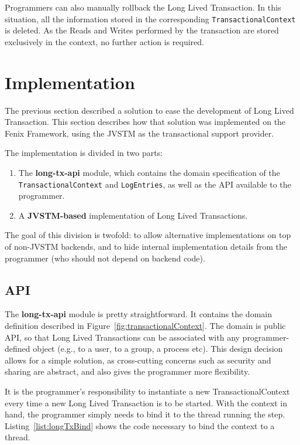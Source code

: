 Programmers can also manually rollback the Long Lived Transaction. In
this situation, all the information stored in the corresponding
\texttt{TransactionalContext} is deleted. As the Reads and Writes
performed by the transaction are stored exclusively in the context, no
further action is required.

\section{Implementation}
\label{sec:impl}


The previous section described a solution to ease the development of
Long Lived Transaction. This section describes how that solution was
implemented on the Fenix Framework, using the JVSTM as the
transactional support provider.

The implementation is divided in two parts:

\begin{enumerate}

\item The {\bf long-tx-api} module, which contains the domain
  specification of the \texttt{TransactionalContext} and
  \texttt{LogEntries}, as well as the API available to the programmer.

\item A {\bf JVSTM-based} implementation of Long Lived Transactions.
\end{enumerate}

The goal of this division is twofold: to allow alternative
implementations on top of non-JVSTM backends, and to hide internal
implementation details from the programmer (who should not depend on
backend code).

\subsection{API}

The {\bf long-tx-api} module is pretty straightforward. It contains
the domain definition described in
Figure~\ref{fig:transactionalContext}. The domain is public API, so
that Long Lived Transactions can be associated with any
programmer-defined object (e.g., to a user, to a group, a process
etc). This design decision allows for a simple solution, as
cross-cutting concerns such as security and sharing are abstract, and
also gives the programmer more flexibility.

It is the programmer's responsibility to instantiate a new
TransactionalContext every time a new Long Lived Transaction is to be
started. With the context in hand, the programmer simply needs to bind
it to the thread running the step. Listing~\ref{list:longTxBind} shows
the code necessary to bind the context to a thread.

